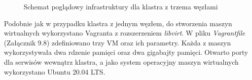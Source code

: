 \begin{figure}[htp]
\caption{Schemat poglądowy infrastruktury dla klastra z trzema węzłami}
\end{figure}
\newpage

Podobnie jak w przypadku klastra z jednym węzłem, do stworzenia maszyn wirtualnych wykorzystano Vagranta z rozszerzeniem \textit{libvirt}. W pliku \textit{Vagrantfile} (Załącznik 9.8) zdefiniowano trzy VM oraz ich parametry. Każda z maszyn wykorzystywała dwa rdzenie pamięci oraz dwa gigabajty pamięci. Otwarto porty dla serwisów wewnątrz klastra, a jako system operacyjny maszyn wirtualnych wykorzystano Ubuntu 20.04 LTS. 


